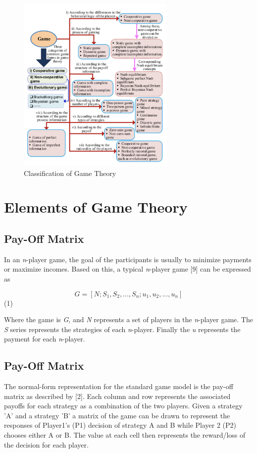 \begin{figure}
  \centering
  \includegraphics[width=3.0in]{Figures/game_classification.png}
  \caption{Classification of Game Theory}
  \label{classification of gametheory}
\end{figure}

\section{Elements of Game Theory}

\subsection{Pay-Off Matrix}

In an \textit{n}-player game, the goal of the participants is 
usually to minimize payments or maximize incomes. Based on this, 
a typical \textit{n}-player game [9] can be expressed as

$$G = [N;S_{1},S_{2},...,S_{n};u_{1},u_{2},...,u_{n}]$$ (1)

Where the game is \textit{G}, and \textit{N} represents a set of players 
in the \textit{n}-player game. The \textit{S} series represents the strategies 
of each \textit{n}-player. Finally the \textit{u} represents the payment for 
each \textit{n}-player. 

\subsection{Pay-Off Matrix}
The normal-form representation for the standard game model is 
the pay-off matrix as described by [2]. Each column and row represents 
the associated payoffs for each strategy as a combination of the two 
players. Given a strategy 'A' and a strategy 'B' a matrix of the game 
can be drawn to represent the responses of Player1's (P1) decision of 
strategy A and B while Player 2 (P2) chooses either A or B. The value
at each cell then represents the reward/loss of the decision for each 
player. 

